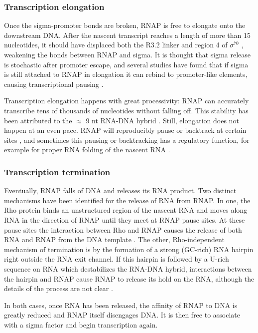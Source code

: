 \subsubsection{Transcription elongation}
Once the sigma-promoter bonds are broken, RNAP is free to elongate onto the
downstream DNA. After the nascent transcript reaches a length of more than 15
nucleotides, it should have displaced both the R3.2 linker and region 4 of
$\sigma^{70}$ \cite{mekler_structural_2002, nickels_interaction_2005},
weakening the bonds between RNAP and sigma. It is thought that sigma release is
stochastic after promoter escape, and several studies have found that if sigma
is still attached to RNAP in elongation it can rebind to promoter-like
elements, causing transcriptional pausing \cite{ring_function_1996,
kapanidis_retention_2005, raffaelle_holoenzyme_2005}.

Transcription elongation happens with great processivity: RNAP can accurately
transcribe tens of thousands of nucleotides without falling off. This stability
has been attributed to the $\approx$ 9 nt RNA-DNA hybrid
\cite{nudler_rna-dna_1997}. Still, elongation does not happen at an even pace.
RNAP will reproducibly pause or backtrack at certain sites
\cite{herbert_sequence-resolved_2006}, and sometimes this pausing or
backtracking has a regulatory function, for example for proper RNA folding of
the nascent RNA \cite{landick_r_regulatory_2006}.

\subsubsection{Transcription termination}
Eventually, RNAP falls of DNA and releases its RNA product. Two distinct
mechanisms have been identified for the release of RNA from RNAP. In one, the Rho
protein binds an unstructured region of the nascent RNA and moves along RNA in
the direction of RNAP until they meet at RNAP pause sites. At these pause sites
the interaction between Rho and RNAP causes the release of both RNA and RNAP
from the DNA template \cite{ciampi_rho-dependent_2006}. The other,
Rho-independent mechanism of termination is by the formation of a strong
(GC-rich) RNA hairpin right outside the RNA exit channel. If this hairpin is
followed by a U-rich sequence on RNA which destabilizes the RNA-DNA hybrid,
interactions between the hairpin and RNAP cause RNAP to release its hold on the
RNA, although the details of the process are not clear
\cite{nudler_transcription_2002}.

In both cases, once RNA has been released, the affinity of RNAP to DNA is
greatly reduced and RNAP itself disengages DNA. It is then free to associate
with a sigma factor and begin transcription again.
